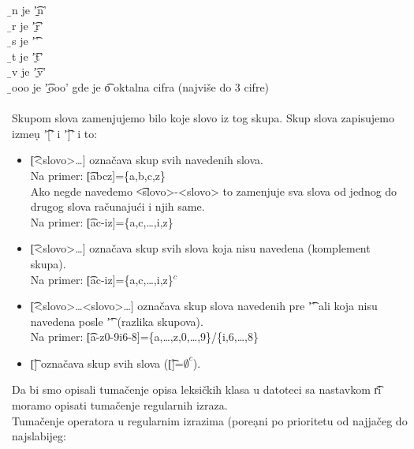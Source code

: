       \hs\t{{\b}n} je \t{'{\b}n'}\\
      \hs\t{{\b}r} je \t{'{\b}r'}\\
      \hs\t{{\b}s} je \t{'\s'}\\
      \hs\t{{\b}t} je \t{'{\b}t'}\\
      \hs\t{{\b}v} je \t{'{\b}v'}\\
      \hs\t{{\b}ooo} je \t{'{\b}ooo'} gde je \t{o} oktalna cifra
      (najvi\v se do 3 cifre)\\
      \\
      Skupom slova zamenjujemo bilo koje slovo iz tog skupa.
      Skup slova zapisujemo izme\d u \t{'['} i \t{']'} i to:
      \begin{itemize}
        \item
        {
          \t{[<slovo>\ldots]} ozna\v cava skup svih navedenih slova.\\
          Na primer: \t{[abcz]=\{a,b,c,z\}}\\
          Ako negde navedemo \t{<slovo>-<slovo>} to zamenjuje sva slova
          od jednog do drugog slova ra\v cunaju\'ci i njih same.\\
          Na primer: \t{[ac-iz]=\{a,c,\ldots,i,z\}}
        }
        \item
        {
          \t{[\x<slovo>\ldots]} ozna\v cava skup svih slova koja
          nisu navedena (komplement skupa).\\
          Na primer: \t{[{\x}ac-iz]=\{a,c,\ldots,i,z\}$^{c}$}
        }
        \item
        {
          \t{[<slovo>\ldots\x<slovo>\ldots]} ozna\v cava skup slova
          navedenih pre \t{'\x'} ali koja nisu navedena posle \t{'\x'}
          (razlika skupova).\\
          Na primer: \t{[a-z0-9{\x}i6-8]=\{a,\ldots,z,0,\ldots,9\}/\{i,6,\ldots,8\}}
        }
        \item
        {
          \t{[\x]} ozna\v cava skup svih slova (\t{[\x]=$\emptyset^{c}$}).
        }
      \end{itemize}
%
%
      Da bi smo opisali tuma\v cenje opisa leksi\v ckih klasa u datoteci sa
      nastavkom \t{ri} moramo opisati tuma\v cenje regularnih izraza.
      \\
      Tuma\v cenje operatora u regularnim izra\-zima (pore\d ani po
      prioritetu od najja\v ceg do najslabijeg:
